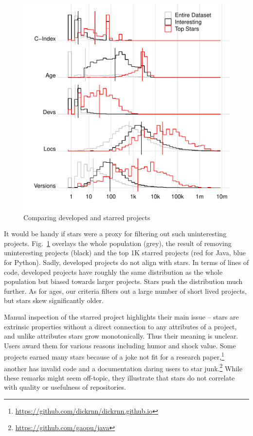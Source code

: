 \documentclass[sigconf,review,anonymous]{acmart}
\begin{document}
\begin{figure}[!b]
  \includegraphics[width=.9\columnwidth]{../figs/lang_interesting_stars}
  \caption{Comparing developed and starred projects}\label{interestingVsStars}
\end{figure}

It would be handy if stars were a proxy for filtering out such uninteresting
projects. Fig.~\ref{interestingVsStars} overlays the whole population (grey),
the result of removing uninteresting projects (black) and the top 1K starred
projects (red for Java, blue for Python). Sadly, developed projects do not align
with stars. In terms of lines of code, developed projects have roughly the same
distribution as the whole population but biased towards larger projects. Stars
push the distribution much further. As for ages, our criteria filters out a
large number of short lived projects, but stars skew significantly older.

\newpage

Manual inspection of the starred project highlights their main issue
-- stars are extrinsic properties without a direct connection to any
attributes of a project, and unlike attributes stars grow
monotonically. Thus their meaning is unclear. Users award them for
various reasons including humor and shock value.  Some projects earned
many stars because of a joke not fit for a research
paper,\footnote{\url{https://github.com/dickrnn/dickrnn.github.io}}
another has invalid code and a documentation daring users to star
junk.\footnote{\url{https://github.com/gaopu/java}}  While these
remarks might seem off-topic, they illustrate that stars do not
correlate with quality or usefulness of repositories.
\end{document}
